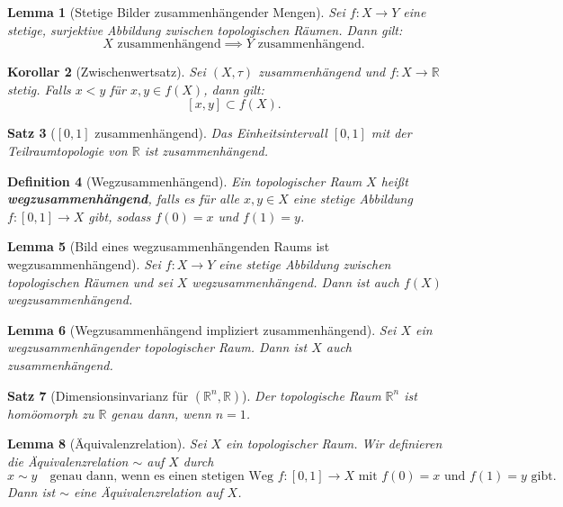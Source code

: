 \documentclass[a4paper,12pt]{article}
\theoremstyle{break}
\newtheorem{definition}{Definition}[section]
\newtheorem{theorem}[definition]{Satz}
\newtheorem{lemma}[definition]{Lemma}
\newtheorem{corollary}[definition]{Korollar}
\begin{document}
\begin{lemma}[Stetige Bilder zusammenhängender Mengen]
Sei $f: X \to Y$ eine stetige, surjektive Abbildung zwischen topologischen Räumen. Dann gilt:
\[
X \text{ zusammenhängend} \implies Y \text{ zusammenhängend}.
\]
\end{lemma}

\begin{corollary}[Zwischenwertsatz]
Sei $(X, \tau)$ zusammenhängend und $f : X \to \mathbb{R}$ stetig. Falls $x < y$ für $x, y \in f(X)$, dann gilt:
\[
[x, y] \subset f(X).
\]
\end{corollary}

\begin{theorem}[{$[0,1]$} zusammenhängend]
Das Einheitsintervall $[0,1]$ mit der Teilraumtopologie von $\mathbb{R}$ ist zusammenhängend.
\end{theorem}

\begin{definition}[Wegzusammenhängend]
Ein topologischer Raum $X$ heißt \textbf{wegzusammenhängend}, falls es für alle $x, y \in X$ eine stetige Abbildung $f : [0,1] \to X$ gibt, sodass $f(0) = x$ und $f(1) = y$.
\end{definition}

\begin{lemma}[Bild eines wegzusammenhängenden Raums ist wegzusammenhängend]
Sei $f : X \to Y$ eine stetige Abbildung zwischen topologischen Räumen und sei $X$ wegzusammenhängend. Dann ist auch $f(X)$ wegzusammenhängend.
\end{lemma}

\begin{lemma}[Wegzusammenhängend impliziert zusammenhängend]
Sei $X$ ein wegzusammenhängender topologischer Raum. Dann ist $X$ auch zusammenhängend.
\end{lemma}

\begin{theorem}[Dimensionsinvarianz für $(\mathbb{R}^n, \mathbb{R})$]
Der topologische Raum $\mathbb{R}^n$ ist homöomorph zu $\mathbb{R}$ genau dann, wenn $n = 1$.
\end{theorem}

\begin{lemma}[Äquivalenzrelation]\label{lemma:äquivalenz_topologie}
Sei $X$ ein topologischer Raum. Wir definieren die Äquivalenzrelation $\sim$ auf $X$ durch
\[
x \sim y \quad \text{genau dann, wenn es einen stetigen Weg } f : [0,1] \to X \text{ mit } f(0) = x \text{ und } f(1) = y \text{ gibt.}
\]
Dann ist $\sim$ eine Äquivalenzrelation auf $X$.
\end{lemma}
\end{document}
